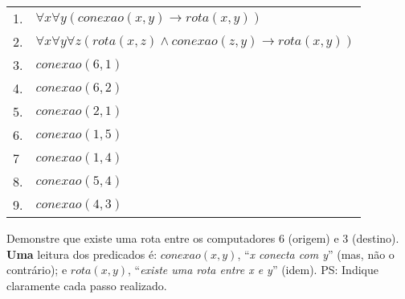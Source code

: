 \documentclass[a4paper,11pt]{article}
\begin{document}
\begin{enumerate}
\begin{tabular}{ll}
\\  \hline \hline
    1. &  $\forall x \forall y ( conexao(x,y)  \rightarrow rota(x,y) )$ \\
    2. &  $ \forall x \forall y \forall z(rota(x,z) \wedge conexao(z,y) \rightarrow rota(x,y) ) $ \\
    3. &  $ conexao(6,1) $ \\
    4. &  $ conexao(6,2) $ \\
    5. &  $ conexao(2,1) $ \\
    6. &  $ conexao(1,5) $ \\
    7 &  $ conexao(1,4) $ \\
    8. &  $ conexao(5,4) $ \\
    9. &  $ conexao(4,3) $ \\
    \hline \hline
 \end{tabular}

Demonstre que existe uma rota entre
os computadores $6$ (origem) e $3$ (destino). {\bf Uma} leitura  dos predicados é: $conexao(x,y)$, ``{\em x conecta com y}'' (mas, não o contrário);  e 
$rota(x,y)$, ``{\em existe uma rota entre x  e y}'' (idem). 
PS: Indique claramente cada passo realizado.

\begin{comment}
\begin{tabular}{ll}
 \hline \hline
    1. &  $\forall y \exists x ( pessoa(y) \wedge pet(x) \wedge vacinado(x) \rightarrow ama(y, x) )$ \\
    2. &  $ \forall x ( pet(x) \wedge saudavel(x) \rightarrow vacinado(x) ) $ \\
    3. &  $ pessoa(mickey) $ \\
    4. &  $ pet(pluto) $ \\
    5. &  $saudavel(pluto)$ \\
    \hline \hline
 \end{tabular}

 Na sequência abaixo, resolva as seguintes questões:
\begin{enumerate}
\setlength{\itemsep}{-3pt}
\item {\bf (1.0 pt)} Interprete textualmente o significado de cada fórmula acima
\item {\bf (2.0 pts)} Utilizando as propriedades da LPO, PU's, PE's e regras de inferências, deduza se {\it Mickey} ama {\it Pluto}.
\end{enumerate}
\end{comment}



\end{enumerate}
\end{document}

